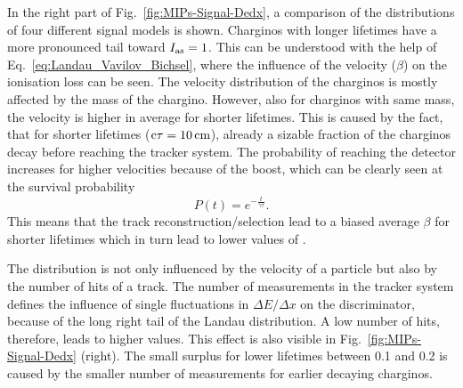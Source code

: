 In the right part of Fig.~\ref{fig:MIPs-Signal-Dedx}, a comparison of the \ias distributions of four different signal models is shown.
Charginos with longer lifetimes have a more pronounced tail toward $I_{\text{as}}=1$.
This can be understood with the help of Eq.~\eqref{eq:Landau_Vavilov_Bichsel}, where the influence of the velocity ($\beta$) on the ionisation loss can be seen.
The velocity distribution of the charginos is mostly affected by the mass of the chargino.
However, also for charginos with same mass, the velocity is higher in average for shorter lifetimes.
This is caused by the fact, that for shorter lifetimes (\eg $\text{c}\tau=10\,\text{cm}$), already a sizable fraction of the charginos decay before reaching the tracker system.
The probability of reaching the detector increases for higher velocities because of the boost, which can be clearly seen at the survival probability
\begin{equation}
P \left( t \right) = e^{-\frac{t}{\gamma \tau}}.
\end{equation} 
This means that the track reconstruction/selection lead to a biased average $\beta$ for shorter lifetimes which in turn lead to lower values of \ias.

The \ias distribution is not only influenced by the velocity of a particle but also by the number of hits of a track.
The number of measurements in the tracker system defines the influence of single fluctuations in $\Delta E/\Delta x$ on the \ias discriminator, because of the long right tail of the Landau distribution.
A low number of hits, therefore, leads to higher \ias values.
This effect is also visible in Fig.~\ref{fig:MIPs-Signal-Dedx} (right). 
The small surplus for lower lifetimes between 0.1 and 0.2 is caused by the smaller number of measurements for earlier decaying charginos.



